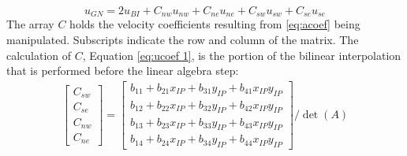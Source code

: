 \documentclass[preprint,12pt]{elsarticle}
\begin{document}
\begin{equation}
u_{GN} = 2u_{BI} + C_{nw}u_{nw} + C_{ne}u_{ne} + C_{sw}u_{sw} + C_{se}u_{se}\label{eq:ID reorganized interpolation}
\end{equation}
The array $C$ holds the velocity coefficients resulting from \eqref{eq:acoef} being manipulated.
Subscripts indicate the row and column of the matrix.
The calculation of $C$, Equation \eqref{eq:ucoef 1}, is the portion of the bilinear interpolation that is performed before the linear algebra step:
\begin{gather}
\begin{bmatrix}
C_{sw}\\
C_{se}\\
C_{nw}\\
C_{ne}
\end{bmatrix}
=
\begin{bmatrix}
b_{11}+b_{21}x_{IP}+b_{31}y_{IP}+b_{41}x_{IP}y_{IP}\\
b_{12}+b_{22}x_{IP}+b_{32}y_{IP}+b_{42}x_{IP}y_{IP}\\
b_{13}+b_{23}x_{IP}+b_{33}y_{IP}+b_{43}x_{IP}y_{IP}\\
b_{14}+b_{24}x_{IP}+b_{34}y_{IP}+b_{44}x_{IP}y_{IP}
\end{bmatrix}
/\det{(A)}
\label{eq:ucoef 1}
\end{gather}
\end{document}
